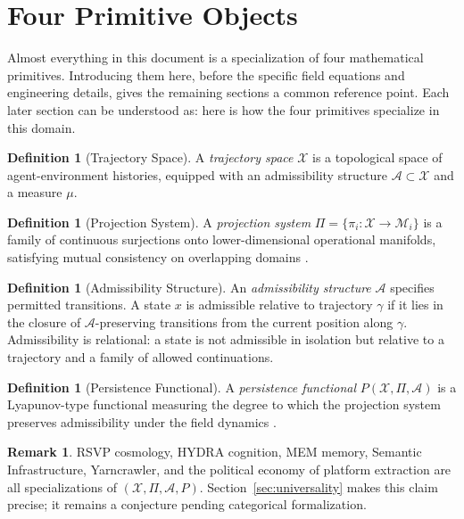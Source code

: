 \documentclass[12pt, a4paper]{article}
\theoremstyle{rsvpstyle}
\theoremstyle{definition}
\newtheorem{definition}[theorem]{Definition}
\newtheorem{remark}[theorem]{Remark}
\newcommand{\Traj}{\mathcal{X}}
\newcommand{\OpMan}{\mathcal{M}}
\newcommand{\Adm}{\mathcal{A}}
\newcommand{\ProjFam}{\Pi}
\newcommand{\Persist}{P}
\begin{document}
\section{Four Primitive Objects}
\label{sec:primitives}

Almost everything in this document is a specialization of four mathematical
primitives. Introducing them here, before the specific field equations and
engineering details, gives the remaining sections a common reference point.
Each later section can be understood as: here is how the four primitives
specialize in this domain.

\begin{definition}[Trajectory Space]
A \emph{trajectory space} $\Traj$ is a topological space of agent-environment
histories, equipped with an admissibility structure $\Adm \subset \Traj$ and
a measure $\mu$.
\end{definition}

\begin{definition}[Projection System]
A \emph{projection system} $\ProjFam = \{\pi_i : \Traj \to \OpMan_i\}$ is a
family of continuous surjections onto lower-dimensional operational manifolds,
satisfying mutual consistency on overlapping domains \citep{TenenbaumSilvaLangford2000}.
\end{definition}

\begin{definition}[Admissibility Structure]
An \emph{admissibility structure} $\Adm$ specifies permitted transitions.
A state $x$ is admissible relative to trajectory $\gamma$ if it lies in the
closure of $\Adm$-preserving transitions from the current position along $\gamma$.
Admissibility is relational: a state is not admissible in isolation but
relative to a trajectory and a family of allowed continuations.
\end{definition}

\begin{definition}[Persistence Functional]
A \emph{persistence functional} $\Persist(\Traj, \ProjFam, \Adm)$ is a
Lyapunov-type functional measuring the degree to which the projection system
preserves admissibility under the field dynamics \citep{Arnold1989}.
\end{definition}

\begin{remark}
RSVP cosmology, HYDRA cognition, MEM memory, Semantic Infrastructure,
Yarncrawler, and the political economy of platform extraction are all
specializations of $(\Traj, \ProjFam, \Adm, \Persist)$. Section~\ref{sec:universality}
makes this claim precise; it remains a conjecture pending categorical formalization.
\end{remark}
\end{document}

